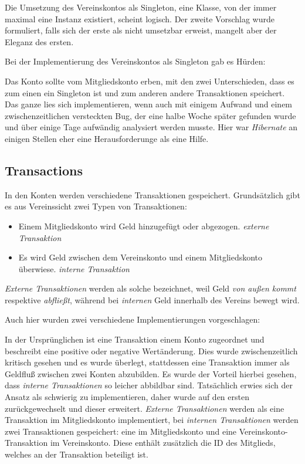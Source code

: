 \documentclass[a4paper, 11pt]{article}
\begin{document}
Die Umsetzung des Vereinskontos als Singleton, eine Klasse, von der immer
maximal eine Instanz existiert, scheint logisch. Der zweite Vorschlag wurde
formuliert, falls sich der erste als nicht umsetzbar erweist, mangelt aber der
Eleganz des ersten.

Bei der Implementierung des Vereinskontos als Singleton gab es Hürden:

Das Konto sollte vom Mitgliedskonto erben, mit den zwei Unterschieden, dass es
zum einen ein Singleton ist und zum anderen andere Transaktionen speichert. Das
ganze lies sich implementieren, wenn auch mit einigem Aufwand und einem
zwischenzeitlichen versteckten Bug, der eine halbe Woche später gefunden wurde
und über einige Tage aufwändig analysiert werden musste. Hier war
\emph{Hibernate} an einigen Stellen eher eine Herausforderunge als eine Hilfe.

\subsection{Transactions}

In den Konten werden verschiedene Transaktionen gespeichert. Grundsätzlich gibt es aus Vereinssicht zwei Typen von Transaktionen:

\begin{itemize}
    \item Einem Mitgliedskonto wird Geld hinzugefügt oder abgezogen. \emph{externe Transaktion}
    \item Es wird Geld zwischen dem Vereinskonto und einem Mitgliedskonto überwiese. \emph{interne Transaktion}
\end{itemize}

\emph{Externe Transaktionen} werden als solche bezeichnet, weil Geld \emph{von
außen kommt} respektive \emph{abfließt}, während bei \emph{internen} Geld
innerhalb des Vereins bewegt wird.

Auch hier wurden zwei verschiedene Implementierungen vorgeschlagen:

In der Ursprünglichen ist eine Transaktion einem Konto zugeordnet und
beschreibt eine positive oder negative Wertänderung. Dies wurde
zwischenzeitlich kritisch gesehen und es wurde überlegt, stattdessen eine
Transaktion immer als Geldfluß zwischen zwei Konten abzubilden. Es wurde der
Vorteil hierbei gesehen, dass \emph{interne Transaktionen} so leicher abbildbar
sind. Tatsächlich erwies sich der Ansatz als schwierig zu implementieren, daher
wurde auf den ersten zurückgewechselt und dieser erweitert. \emph{Externe
Transaktionen} werden als eine Transaktion im Mitgliedskonto implementiert, bei
\emph{internen Transaktionen} werden zwei Transaktionen gespeichert: eine im
Mitgliedskonto und eine Vereinskonto-Transaktion im Vereinskonto. Diese enthält
zusätzlich die ID des Mitglieds, welches an der Transaktion beteiligt ist.
\end{document}
